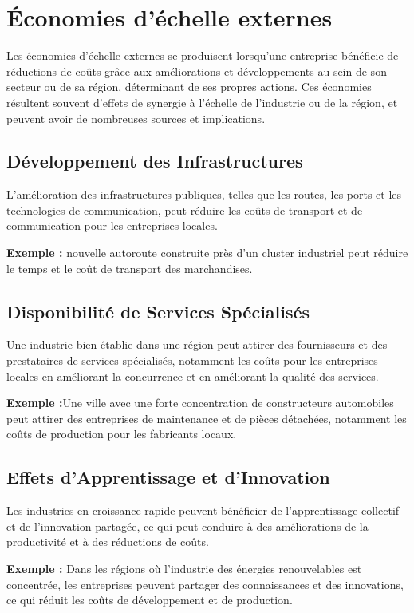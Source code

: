 \section{Économies d’échelle externes}
Les économies d'échelle externes se produisent lorsqu'une entreprise bénéficie
de réductions de coûts grâce aux améliorations et développements au sein de son
secteur ou de sa région, déterminant de ses propres actions. Ces économies
résultent souvent d'effets de synergie à l'échelle de l'industrie ou de la
région, et peuvent avoir de nombreuses sources et implications.
\subsection{Développement des Infrastructures}
L'amélioration des infrastructures publiques, telles que les routes, les ports
et les technologies de communication, peut réduire les coûts de transport et de
communication pour les entreprises locales.\par
\textbf{Exemple :}
nouvelle autoroute construite près d'un cluster industriel peut réduire le temps et le coût de transport des marchandises.

\subsection{Disponibilité de Services Spécialisés}
Une industrie bien établie dans une région peut attirer des fournisseurs et des
prestataires de services spécialisés, notamment les coûts pour les entreprises
locales en améliorant la concurrence et en améliorant la qualité des services.
\par
\textbf{Exemple :}Une ville avec une forte concentration de constructeurs automobiles peut attirer des entreprises de maintenance et de pièces détachées, notamment les coûts de production pour les fabricants locaux.
\subsection{Effets d'Apprentissage et d'Innovation}
Les industries en croissance rapide peuvent bénéficier de l'apprentissage
collectif et de l'innovation partagée, ce qui peut conduire à des améliorations
de la productivité et à des réductions de coûts.
\par
\textbf{Exemple :} Dans les régions où l'industrie des énergies renouvelables est
concentrée, les entreprises peuvent partager des connaissances et des
innovations, ce qui réduit les coûts de développement et de production.

